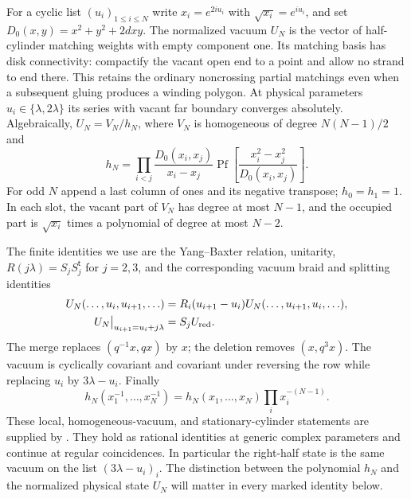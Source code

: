 For a cyclic list $(u_i)_{1\le i\le N}$ write $x_i=e^{2iu_i}$ with
$\sqrt{x_i}=e^{iu_i}$, and set $D_0(x,y)=x^2+y^2+2dxy$.
The normalized vacuum $U_N$ is the vector of half-cylinder matching
weights with empty component one. Its matching basis has disk
connectivity: compactify the vacant open end to a point and allow no
strand to end there. This retains the ordinary noncrossing partial
matchings even when a subsequent gluing produces a winding polygon.
At physical parameters
$u_i\in\{\lambda,2\lambda\}$ its series with vacant far boundary
converges absolutely. Algebraically, $U_N=V_N/h_N$, where $V_N$ is
homogeneous of degree $N(N-1)/2$ and
\begin{equation}\label{eq:vacuum-pfaffian}
 h_N=\prod_{i<j}\frac{D_0(x_i,x_j)}{x_i-x_j}
       \operatorname{Pf}\left[\frac{x_i^2-x_j^2}{D_0(x_i,x_j)}\right].
\end{equation}
For odd $N$ append a last column of ones and its negative transpose;
$h_0=h_1=1$. In each slot, the vacant part of $V_N$ has degree at
most $N-1$, and the occupied part is $\sqrt{x_i}$ times a polynomial
of degree at most $N-2$.

The finite identities we use are the Yang--Baxter relation, unitarity,
$R(j\lambda)=S_jS_j^{\mathsf t}$ for $j=2,3$, and the corresponding
vacuum braid and splitting identities
\[
\begin{aligned}
 U_N(\ldots,u_i,u_{i+1},\ldots)
 &=R_i(u_{i+1}-u_i)U_N(\ldots,u_{i+1},u_i,\ldots),\\
 U_N\big|_{u_{i+1}=u_i+j\lambda}&=S_jU_{\rm red}.
\end{aligned}
\]
The merge replaces $(q^{-1}x,qx)$ by $x$; the deletion removes
$(x,q^3x)$. The vacuum is cyclically covariant and covariant under
reversing the row while replacing $u_i$ by $3\lambda-u_i$.
Finally
\[
 h_N(x_1^{-1},\ldots,x_N^{-1})
 =h_N(x_1,\ldots,x_N)\prod_i x_i^{-(N-1)}.
\]
These local, homogeneous-vacuum, and stationary-cylinder statements
are supplied by \cite[Proposition~2.2, Lemma~2.3, and
Proposition~2.6]{Electric}. They hold as rational identities
at generic complex parameters and continue at regular coincidences.
In particular the right-half state is the same vacuum on the list
$(3\lambda-u_i)_i$. The distinction between the polynomial $h_N$
and the normalized physical state $U_N$ will matter in every marked
identity below.

